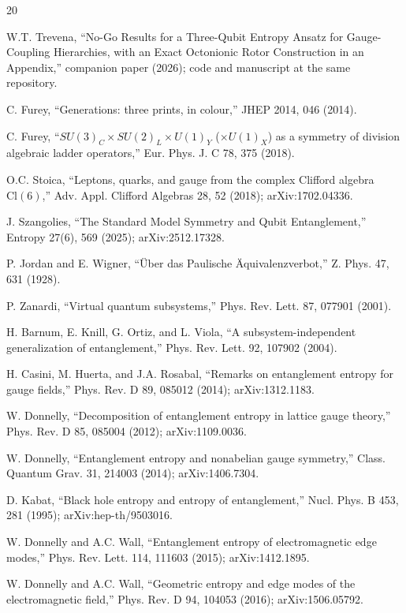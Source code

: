 \documentclass[11pt]{article}
\begin{document}
\begin{thebibliography}{20}

 W.T. Trevena, ``No-Go Results for a Three-Qubit Entropy Ansatz for Gauge-Coupling Hierarchies, with an Exact Octonionic Rotor Construction in an Appendix,'' companion paper (2026); code and manuscript at the same repository.

 C. Furey, ``Generations: three prints, in colour,'' JHEP 2014, 046 (2014).

 C. Furey, ``$SU(3)_C \times SU(2)_L \times U(1)_Y$ ($\times U(1)_X$) as a symmetry of division algebraic ladder operators,'' Eur. Phys. J. C 78, 375 (2018).

 O.C. Stoica, ``Leptons, quarks, and gauge from the complex Clifford algebra $\mathrm{Cl}(6)$,'' Adv. Appl. Clifford Algebras 28, 52 (2018); arXiv:1702.04336.

 J. Szangolies, ``The Standard Model Symmetry and Qubit Entanglement,'' Entropy 27(6), 569 (2025); arXiv:2512.17328.

 P. Jordan and E. Wigner, ``\"Uber das Paulische \"Aquivalenzverbot,'' Z. Phys. 47, 631 (1928).

 P. Zanardi, ``Virtual quantum subsystems,'' Phys. Rev. Lett. 87, 077901 (2001).

 H. Barnum, E. Knill, G. Ortiz, and L. Viola, ``A subsystem-independent generalization of entanglement,'' Phys. Rev. Lett. 92, 107902 (2004).

 H. Casini, M. Huerta, and J.A. Rosabal, ``Remarks on entanglement entropy for gauge fields,'' Phys. Rev. D 89, 085012 (2014); arXiv:1312.1183.

 W. Donnelly, ``Decomposition of entanglement entropy in lattice gauge theory,'' Phys. Rev. D 85, 085004 (2012); arXiv:1109.0036.

 W. Donnelly, ``Entanglement entropy and nonabelian gauge symmetry,'' Class. Quantum Grav. 31, 214003 (2014); arXiv:1406.7304.

 D. Kabat, ``Black hole entropy and entropy of entanglement,'' Nucl. Phys. B 453, 281 (1995); arXiv:hep-th/9503016.

 W. Donnelly and A.C. Wall, ``Entanglement entropy of electromagnetic edge modes,'' Phys. Rev. Lett. 114, 111603 (2015); arXiv:1412.1895.

 W. Donnelly and A.C. Wall, ``Geometric entropy and edge modes of the electromagnetic field,'' Phys. Rev. D 94, 104053 (2016); arXiv:1506.05792.


\end{thebibliography}
\end{document}
